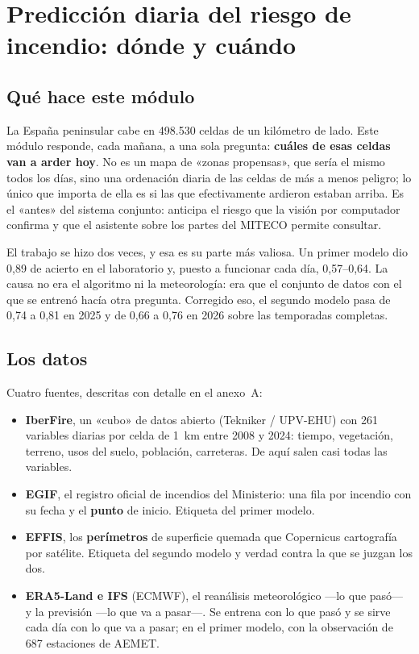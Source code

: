 \documentclass[11pt,a4paper]{article}
\begin{document}
\section{Predicción diaria del riesgo de incendio: dónde y cuándo}
\label{sec:ml}

\subsection{Qué hace este módulo}

La España peninsular cabe en 498.530 celdas de un kilómetro de lado. Este
módulo responde, cada mañana, a una sola pregunta: \textbf{cuáles de esas
celdas van a arder hoy}. No es un mapa de «zonas propensas», que sería el mismo
todos los días, sino una ordenación diaria de las celdas de más a menos
peligro; lo único que importa de ella es si las que efectivamente ardieron
estaban arriba. Es el «antes» del sistema conjunto: anticipa el riesgo que la
visión por computador confirma y que el asistente sobre los partes del MITECO
permite consultar.

El trabajo se hizo dos veces, y esa es su parte más valiosa. Un primer modelo
dio 0,89 de acierto en el laboratorio y, puesto a funcionar cada día,
0,57--0,64. La causa no era el algoritmo ni la meteorología: era que el
conjunto de datos con el que se entrenó hacía otra pregunta. Corregido eso, el
segundo modelo pasa de 0,74 a 0,81 en 2025 y de 0,66 a 0,76 en 2026 sobre las
temporadas completas.

\subsection{Los datos}

Cuatro fuentes, descritas con detalle en el anexo~A:

\begin{itemize}
  \item \textbf{IberFire}, un «cubo» de datos abierto (Tekniker / UPV-EHU) con
  261 variables diarias por celda de 1~km entre 2008 y 2024: tiempo,
  vegetación, terreno, usos del suelo, población, carreteras. De aquí salen
  casi todas las variables.
  \item \textbf{EGIF}, el registro oficial de incendios del Ministerio: una
  fila por incendio con su fecha y el \textbf{punto} de inicio. Etiqueta del
  primer modelo.
  \item \textbf{EFFIS}, los \textbf{perímetros} de superficie quemada que
  Copernicus cartografía por satélite. Etiqueta del segundo modelo y verdad
  contra la que se juzgan los dos.
  \item \textbf{ERA5-Land e IFS} (ECMWF), el reanálisis meteorológico ---lo
  que pasó--- y la previsión ---lo que va a pasar---. Se entrena con lo que
  pasó y se sirve cada día con lo que va a pasar; en el primer modelo, con la
  observación de 687 estaciones de AEMET.
\end{itemize}
\end{document}
